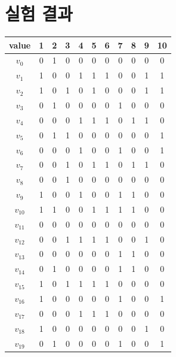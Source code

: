\documentclass{article}
\begin{document}
    \newpage

    \appendix
    \section{실험 결과}\label{results}

    \begin{table}[htb!]
    \small
    \begin{minipage}{0.475\linewidth}
    \begin{tabular}{c | c c c c c c c c c c}
        \hline
        value & 1 & 2 & 3 & 4 & 5 & 6 & 7 & 8 & 9 & 10 \\
        \hline
        $v_0$ & 0 & 1 & 0 & 0 & 0 & 0 & 0 & 0 & 0 & 0 \\
        $v_1$ & 1 & 0 & 0 & 1 & 1 & 1 & 0 & 0 & 1 & 1 \\
        $v_2$ & 1 & 0 & 1 & 0 & 1 & 0 & 0 & 0 & 1 & 1 \\
        $v_3$ & 0 & 1 & 0 & 0 & 0 & 0 & 1 & 0 & 0 & 0 \\
        $v_4$ & 0 & 0 & 0 & 1 & 1 & 1 & 0 & 1 & 1 & 0 \\
        $v_5$ & 0 & 1 & 1 & 0 & 0 & 0 & 0 & 0 & 0 & 1 \\
        $v_6$ & 0 & 0 & 0 & 1 & 0 & 0 & 1 & 0 & 0 & 1 \\
        $v_7$ & 0 & 0 & 1 & 0 & 1 & 1 & 0 & 1 & 1 & 0 \\
        $v_8$ & 0 & 0 & 1 & 0 & 0 & 0 & 0 & 0 & 0 & 0 \\
        $v_9$ & 1 & 0 & 0 & 1 & 0 & 0 & 1 & 1 & 0 & 0 \\
        $v_{10}$ & 1 & 1 & 0 & 0 & 1 & 1 & 1 & 1 & 0 & 0 \\
        $v_{11}$ & 0 & 0 & 0 & 0 & 0 & 0 & 0 & 0 & 0 & 0 \\
        $v_{12}$ & 0 & 0 & 1 & 1 & 1 & 1 & 0 & 0 & 1 & 0 \\
        $v_{13}$ & 0 & 0 & 0 & 0 & 0 & 0 & 1 & 1 & 0 & 0 \\
        $v_{14}$ & 0 & 1 & 0 & 0 & 0 & 0 & 1 & 1 & 0 & 0 \\
        $v_{15}$ & 1 & 0 & 1 & 1 & 1 & 1 & 0 & 0 & 0 & 0 \\
        $v_{16}$ & 1 & 0 & 0 & 0 & 0 & 0 & 1 & 0 & 0 & 1 \\
        $v_{17}$ & 0 & 0 & 0 & 1 & 1 & 1 & 0 & 0 & 0 & 0 \\
        $v_{18}$ & 1 & 0 & 0 & 0 & 0 & 0 & 0 & 0 & 1 & 0 \\
        $v_{19}$ & 0 & 1 & 0 & 0 & 0 & 0 & 1 & 0 & 0 & 1 \\

\end{tabular}
\end{minipage}
\end{table}
\end{document}
